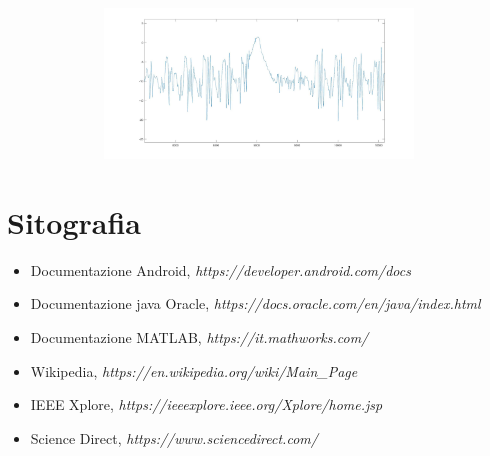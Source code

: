 \documentclass[a4paper, oneside]{book}
\begin{document}
\begin{minipage}{\linewidth}
\begin{center}
\includegraphics[width=154mm, height= 40mm]{./images/finestra_abbassamento/accelerometr_phoneY.jpg}
\end{center}
\end{minipage}
\makebox[\linewidth]{}



\clearpage
	\chapter{Sitografia}

\begin{itemize}
\item Documentazione Android, \textit{https://developer.android.com/docs}
\item Documentazione java Oracle, \textit{https://docs.oracle.com/en/java/index.html}
\item Documentazione MATLAB, \textit{https://it.mathworks.com/}
\item Wikipedia, \textit{https://en.wikipedia.org/wiki/Main\_Page}
\item IEEE Xplore, \textit{https://ieeexplore.ieee.org/Xplore/home.jsp}
\item Science Direct, \textit{https://www.sciencedirect.com/}
\end{itemize}
\end{document}
